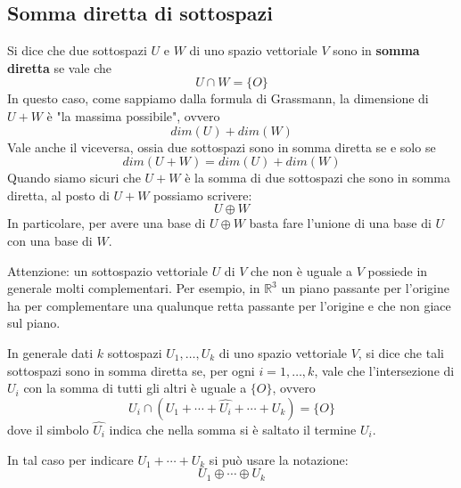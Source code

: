 
\subsection{Somma diretta di sottospazi}
Si dice che due sottospazi $U$ e $W$ di uno spazio vettoriale $V$ sono in
\textbf{somma diretta} se vale che \[ U \cap W = \{O\} \] In questo caso,
come sappiamo dalla formula di Grassmann, la dimensione di $U + W$ \`e "la
massima possibile", ovvero \[ dim(U) + dim(W) \] Vale anche il
viceversa, ossia due sottospazi sono in somma diretta se e solo se
\[ dim(U + W) = dim(U) + dim(W) \] Quando siamo sicuri che $U + W$ \`e la somma di due
sottospazi che sono in somma diretta, al posto di $U + W$ possiamo scrivere:
\begin{equation*}
	U \oplus W
\end{equation*}
In particolare, per avere una base di $U \oplus W$ basta fare l'unione di una
base di $U$ con una base di $W$.

\begin{observation}
	Attenzione: un sottospazio vettoriale $U$ di $V$ che non \`e uguale a $V$
	possiede in generale molti complementari. Per esempio, in $\mathbb{R}^3$
	un piano passante per l'origine ha per complementare una qualunque retta
	passante per l'origine e che non giace sul piano.
\end{observation}

In generale dati $k$ sottospazi $U_1, \dots, U_k$ di uno spazio vettoriale $V$,
si dice che tali sottospazi sono in somma diretta se, per ogni
$i = 1, \dots, k$, vale che l'intersezione di $U_i$ con la somma di tutti
gli altri \`e uguale a $\{O\}$, ovvero
\begin{equation*}
	U_i \cap (U_1 + \cdots + \hat{U_i} + \cdots + U_k) = \{O\}
\end{equation*}
dove il simbolo $\hat{U_i}$ indica che nella somma si \`e saltato il termine
$U_i$.

In tal caso per indicare $U_1 + \cdots + U_k$ si pu\`o usare la notazione:
\begin{equation*}
	U_1 \oplus \cdots \oplus U_k
\end{equation*}